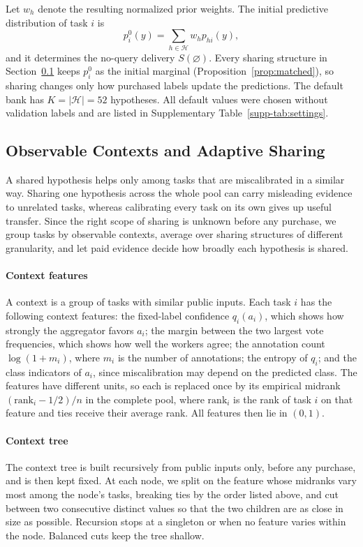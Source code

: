 \documentclass[journal]{IEEEtran}
\begin{document}
Let $w_h$ denote the resulting normalized prior weights. The initial predictive distribution of task $i$ is
\begin{equation}
    p_i^0(y)
    =\sum_{h\in\mathcal{H}}w_h p_{hi}(y),
    \label{eq:p0}
\end{equation}
and it determines the no-query delivery $S(\varnothing)$. Every sharing structure in Section~\ref{sec:context} keeps $p_i^0$ as the initial marginal (Proposition~\ref{prop:matched}), so sharing changes only how purchased labels update the predictions. The default bank has $K=|\mathcal{H}|=52$ hypotheses. All default values were chosen without validation labels and are listed in Supplementary Table~\ref{supp-tab:settings}.

\subsection{Observable Contexts and Adaptive Sharing}
\label{sec:context}

A shared hypothesis helps only among tasks that are miscalibrated in a similar way. Sharing one hypothesis across the whole pool can carry misleading evidence to unrelated tasks, whereas calibrating every task on its own gives up useful transfer. Since the right scope of sharing is unknown before any purchase, we group tasks by observable contexts, average over sharing structures of different granularity, and let paid evidence decide how broadly each hypothesis is shared.

\paragraph{Context features}
A context is a group of tasks with similar public inputs. Each task $i$ has the following context features: the fixed-label confidence $q_i(a_i)$, which shows how strongly the aggregator favors $a_i$; the margin between the two largest vote frequencies, which shows how well the workers agree; the annotation count $\log(1+m_i)$, where $m_i$ is the number of annotations; the entropy of $q_i$; and the class indicators of $a_i$, since miscalibration may depend on the predicted class. The features have different units, so each is replaced once by its empirical midrank $(\mathrm{rank}_i-1/2)/n$ in the complete pool, where $\mathrm{rank}_i$ is the rank of task $i$ on that feature and ties receive their average rank. All features then lie in $(0,1)$.

\paragraph{Context tree}
The context tree is built recursively from public inputs only, before any purchase, and is then kept fixed. At each node, we split on the feature whose midranks vary most among the node's tasks, breaking ties by the order listed above, and cut between two consecutive distinct values so that the two children are as close in size as possible. Recursion stops at a singleton or when no feature varies within the node. Balanced cuts keep the tree shallow.
\end{document}
